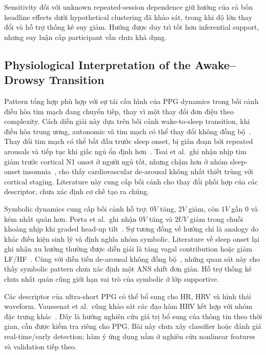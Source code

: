 Sensitivity đối với unknown repeated-session dependence giữ hướng của cả bốn headline effects dưới hypothetical clustering đã khảo sát, trong khi độ lớn thay đổi và hỗ trợ thống kê suy giảm. Hướng được duy trì tốt hơn inferential support, nhưng suy luận cấp participant vẫn chưa khả dụng.

\subsection{Physiological Interpretation of the Awake--Drowsy Transition}

Pattern tổng hợp phù hợp với sự tái cấu hình của PPG dynamics trong bối cảnh điều hòa tim mạch đang chuyển tiếp, thay vì một thay đổi đơn điệu theo complexity. Cách diễn giải này dựa trên bối cảnh wake-to-sleep transition, khi điều hòa trung ương, autonomic và tim mạch có thể thay đổi không đồng bộ~\cite{dezambotti2018,tobaldini2013}. Thay đổi tim mạch có thể bắt đầu trước sleep onset, bị gián đoạn bởi repeated arousals và tiếp tục khi giấc ngủ ổn định hơn~\cite{shinar2006,carrington2005}. Tsai et al.\ ghi nhận nhịp tim giảm trước cortical N1 onset ở người ngủ tốt, nhưng chậm hơn ở nhóm sleep-onset insomnia~\cite{tsai2019}, cho thấy cardiovascular de-arousal không nhất thiết trùng với cortical staging. Literature này cung cấp bối cảnh cho thay đổi phối hợp của các descriptor, chưa xác định cơ chế tạo ra chúng.

Symbolic dynamics cung cấp bối cảnh hỗ trợ: $0V$ tăng, $2V$ giảm, còn $1V$ gần $0$ và kém nhất quán hơn. Porta et al.\ ghi nhận $0V$ tăng và $2UV$ giảm trong chuỗi khoảng nhịp khi graded head-up tilt~\cite{porta2007_symbolic}. Sự tương đồng về hướng chỉ là analogy do khác điều kiện sinh lý và định nghĩa nhóm symbolic. Literature về sleep onset lại ghi nhận xu hướng thường được diễn giải là tăng vagal contribution hoặc giảm LF/HF~\cite{shinar2006,carrington2003}. Cùng với diễn tiến de-arousal không đồng bộ~\cite{tsai2019}, những quan sát này cho thấy symbolic pattern chưa xác định một ANS shift đơn giản. Hỗ trợ thống kê chưa nhất quán cũng giới hạn vai trò của symbolic ở lớp supportive.

Các descriptor của ultra-short PPG có thể bổ sung cho HR, HRV và hình thái waveform. Vaussenat et al.\ cũng khảo sát các đạo hàm HRV kết hợp với nhóm đặc trưng khác~\cite{vaussenat2026}. Đây là hướng nghiên cứu giá trị bổ sung của thông tin theo thời gian, cần được kiểm tra riêng cho PPG. Bài này chưa xây classifier hoặc đánh giá real-time/early detection; hàm ý ứng dụng nằm ở nghiên cứu nonlinear features và validation tiếp theo.

